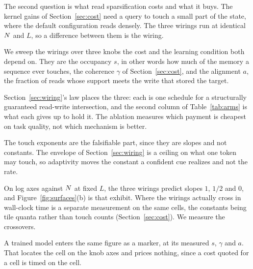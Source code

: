 The second question is what read sparsification costs and what it buys. The kernel gains of Section~\ref{sec:cost} need a query to touch a small part of the state, where the default configuration reads densely. The three wirings run at identical $N$ and $L$, so a difference between them is the wiring.

We sweep the wirings over three knobs the cost and the learning condition both depend on. They are the occupancy $s$, in other words how much of the memory a sequence ever touches, the coherence $\gamma$ of Section~\ref{sec:cost}, and the alignment $a$, the fraction of reads whose support meets the write that stored the target.

Section~\ref{sec:wiring}'s law places the three: each is one schedule for a structurally guaranteed read-write intersection, and the second column of Table~\ref{tab:arms} is what each gives up to hold it. The ablation measures which payment is cheapest on task quality, not which mechanism is better.

The touch exponents are the falsifiable part, since they are slopes and not constants. The envelope of Section~\ref{sec:wiring} is a ceiling on what one token may touch, so adaptivity moves the constant a confident cue realizes and not the rate.

On log axes against $N$ at fixed $L$, the three wirings predict slopes $1$, $1/2$ and $0$, and Figure~\ref{fig:surfaces}(b) is that exhibit. Where the wirings actually cross in wall-clock time is a separate measurement on the same cells, the constants being tile quanta rather than touch counts (Section~\ref{sec:cost}). We measure the crossovers.

A trained model enters the same figure as a marker, at its measured $s$, $\gamma$ and $a$. That locates the cell on the knob axes and prices nothing, since a cost quoted for a cell is timed on the cell.

